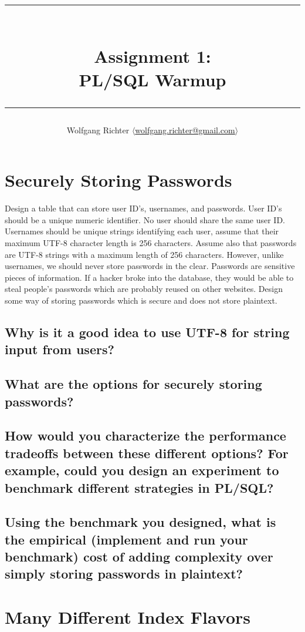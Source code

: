 \documentclass[12pt]{article}
\title{\rule{\linewidth}{0.5mm}\\
\textbf{Assignment 1:}\\
PL/SQL Warmup\\
\rule{\linewidth}{1.0mm}}
\author{Wolfgang Richter \textnormal{$\langle$}\href{mailto:wolfgang.richter@gmail.com}{wolfgang.richter@gmail.com}\textnormal{$\rangle$}}
\begin{document}
\maketitle

\section{Securely Storing Passwords}

Design a table that can store user ID's, usernames, and passwords.  User ID's
should be a unique numeric identifier.  No user should share the same user ID.
Usernames should be unique strings identifying each user, assume that their
maximum UTF-8 character length is 256 characters.  Assume also that passwords
are UTF-8 strings with a maximum length of 256 characters.  However, unlike
usernames, we should never store passwords in the clear.  Passwords are
sensitive pieces of information.  If a hacker broke into the database, they
would be able to steal people's passwords which are probably reused on other
websites.  Design some way of storing passwords which is secure and does not
store plaintext.

\subsection{Why is it a good idea to use UTF-8 for string input from users?}

\subsection{What are the options for securely storing passwords?}

\subsection{How would you characterize the performance tradeoffs between these
different options?  For example, could you design an experiment to benchmark
different strategies in PL/SQL?}

\subsection{Using the benchmark you designed, what is the empirical (implement
and run your benchmark) cost of adding complexity over simply storing passwords
in plaintext?}

\newpage\section{Many Different Index Flavors}
\end{document}
